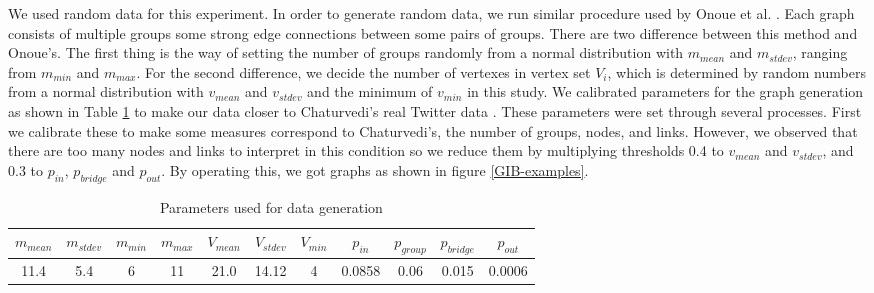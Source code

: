 \documentclass{llncs}
\begin{document}
We used random data for this experiment.
In order to generate random data, we run similar procedure used by Onoue et al. \cite{onoue}.
Each graph consists of multiple groups some strong edge connections between some pairs of groups.
There are two difference between this method and Onoue's.
The first thing is the way of setting the number of groups randomly from a normal distribution with $m_{mean}$ and $m_{stdev}$, ranging from $m_{min}$ and $m_{max}$.
For the second difference, we decide the number of vertexes in vertex set $V_i$, which is determined by random numbers from a normal distribution with $v_{mean}$ and $v_{stdev}$ and the minimum of $v_{min}$ in this study.
We calibrated parameters for the graph generation as shown in Table \ref{params} to make our data closer to Chaturvedi's real Twitter data \cite{chatu}. These parameters were set through several processes. First we calibrate these to make some measures correspond to Chaturvedi's, the number of groups, nodes, and links. However, we observed that there are too many nodes and links to interpret in this condition so we reduce them by multiplying thresholds 0.4 to $v_{mean}$ and $v_{stdev}$, and 0.3 to $p_{in}$, $p_{bridge}$ and $p_{out}$. By operating this, we got graphs as shown in figure \ref{GIB-examples}.

\begin{table}[h]
  \begin{center}
    \begin{tabular}{|c|c|c|c|c|c|c|c|c|c|c|} \hline
      $m_{mean}$ & $m_{stdev}$ & $m_{min}$ & $m_{max}$ & $V_{mean}$ & $V_{stdev}$ & $V_{min}$ & $p_{in}$ & $p_{group}$ & $p_{bridge}$ & $p_{out}$ \\ \hline \hline
      11.4 & 5.4 & 6 & 11 & 21.0 & 14.12 & 4 & 0.0858 & 0.06 & 0.015 & 0.0006 \\ \hline
    \end{tabular}
  \end{center}
  \caption{Parameters used for data generation}
  \label{params}
\end{table}
\end{document}
